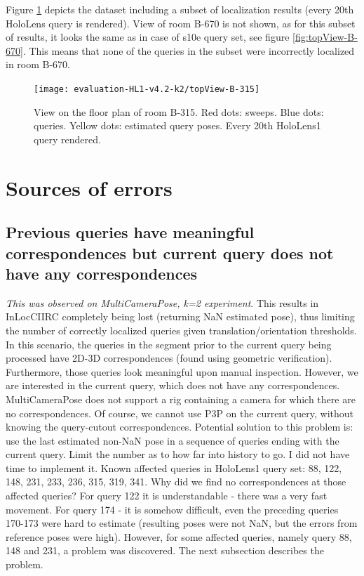 \documentclass[twoside]{ctuthesis}
\theoremstyle{plain}
\theoremstyle{definition}
\theoremstyle{note}
\begin{document}
Figure \ref{fig:HL1-topView-B-315} depicts the dataset including a subset of localization results (every 20th HoloLens query is rendered). View of room B-670 is not shown, as for this subset of results, it looks the same as in case of s10e query set, see figure \ref{fig:topView-B-670}. This means that none of the queries in the subset were incorrectly localized in room B-670.

\begin{figure}[htb!]
	\centering
 	\texttt{[image: evaluation-HL1-v4.2-k2/topView-B-315]}
 	\caption{View on the floor plan of room B-315. Red dots: sweeps. Blue dots: queries. Yellow dots: estimated query poses. Every 20th HoloLens1 query rendered.}
 	\label{fig:HL1-topView-B-315}
\end{figure} 

\section{Sources of errors}
\label{section:sources-of-errors}

\subsection{Previous queries have meaningful correspondences but current query does not have any correspondences}
\emph{This was observed on MultiCameraPose, k=2 experiment}. This results in InLocCIIRC completely being lost (returning NaN estimated pose), thus limiting the number of correctly localized queries given translation/orientation thresholds. In this scenario, the queries in the segment prior to the current query being processed have 2D-3D correspondences (found using geometric verification). Furthermore, those queries look meaningful upon manual inspection. However, we are interested in the current query, which does not have any correspondences. MultiCameraPose does not support a rig containing a camera for which there are no correspondences. Of course, we cannot use P3P on the current query, without knowing the query-cutout correspondences. Potential solution to this problem is: use the last estimated non-NaN pose in a sequence of queries ending with the current query. Limit the number as to how far into history to go. I did not have time to implement it. Known affected queries in HoloLens1 query set: 88, 122, 148, 231, 233, 236, 315, 319, 341. Why did we find no correspondences at those affected queries? For query 122 it is understandable - there was a very fast movement. For query 174 - it is somehow difficult, even the preceding queries 170-173 were hard to estimate (resulting poses were not NaN, but the errors from reference poses were high). However, for some affected queries, namely query 88, 148 and 231, a problem was discovered. The next subsection describes the problem.
\end{document}
